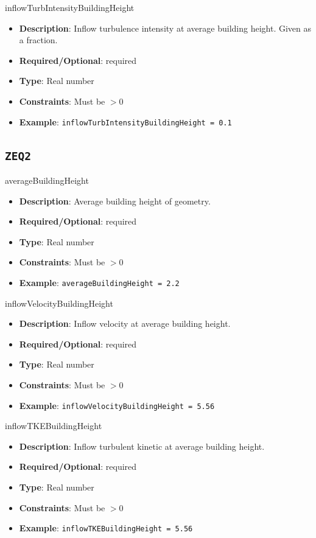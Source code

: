 inflowTurbIntensityBuildingHeight
\vspace{\the\parameterListSpacing}
\begin{itemize}
    \item {\bf Description}: Inflow turbulence intensity at average building height. Given as a fraction.
    \item {\bf Required/Optional}: required
    \item {\bf Type}: Real number
    \item {\bf Constraints}: Must be $>0$
    \item {\bf Example}: \lstinline!inflowTurbIntensityBuildingHeight = 0.1!
\end{itemize}



\newpage
\subsection*{\lstinline!ZEQ2!}
averageBuildingHeight
\vspace{\the\parameterListSpacing}
\begin{itemize}
    \item {\bf Description}: Average building height of geometry.
    \item {\bf Required/Optional}: required
    \item {\bf Type}: Real number
    \item {\bf Constraints}: Must be $>0$
    \item {\bf Example}: \lstinline!averageBuildingHeight = 2.2!
\end{itemize}

inflowVelocityBuildingHeight
\vspace{\the\parameterListSpacing}
\begin{itemize}
    \item {\bf Description}: Inflow velocity at average building height.
    \item {\bf Required/Optional}: required
    \item {\bf Type}: Real number
    \item {\bf Constraints}: Must be $>0$
    \item {\bf Example}: \lstinline!inflowVelocityBuildingHeight = 5.56!
\end{itemize}

inflowTKEBuildingHeight
\vspace{\the\parameterListSpacing}
\begin{itemize}
    \item {\bf Description}: Inflow turbulent kinetic at average building height.
    \item {\bf Required/Optional}: required
    \item {\bf Type}: Real number
    \item {\bf Constraints}: Must be $>0$
    \item {\bf Example}: \lstinline!inflowTKEBuildingHeight = 5.56!
\end{itemize}

